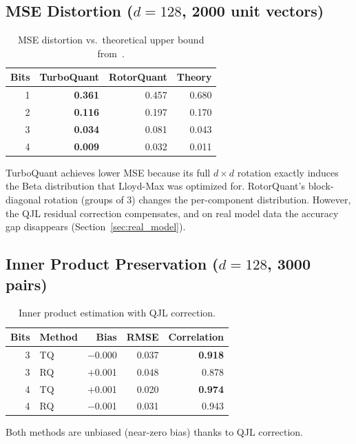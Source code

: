 \documentclass[10pt,twocolumn]{article}
\begin{document}
\subsection{MSE Distortion ($d=128$, 2000 unit vectors)}

\begin{table}[h]
\centering
\caption{MSE distortion vs.\ theoretical upper bound from~\cite{turboquant}.}
\label{tab:mse}
\begin{tabular}{@{}rrrr@{}}
\toprule
Bits & TurboQuant & RotorQuant & Theory \\
\midrule
1 & \textbf{0.361} & 0.457 & 0.680 \\
2 & \textbf{0.116} & 0.197 & 0.170 \\
3 & \textbf{0.034} & 0.081 & 0.043 \\
4 & \textbf{0.009} & 0.032 & 0.011 \\
\bottomrule
\end{tabular}
\end{table}

TurboQuant achieves lower MSE because its full $d \times d$ rotation exactly induces the Beta distribution that Lloyd-Max was optimized for.
RotorQuant's block-diagonal rotation (groups of 3) changes the per-component distribution.
However, the QJL residual correction compensates, and on real model data the accuracy gap disappears (Section~\ref{sec:real_model}).

\subsection{Inner Product Preservation ($d=128$, 3000 pairs)}

\begin{table}[h]
\centering
\caption{Inner product estimation with QJL correction.}
\label{tab:ip}
\begin{tabular}{@{}rlrrr@{}}
\toprule
Bits & Method & Bias & RMSE & Correlation \\
\midrule
3 & TQ & $-$0.000 & 0.037 & \textbf{0.918} \\
3 & RQ & $+$0.001 & 0.048 & 0.878 \\
4 & TQ & $+$0.001 & 0.020 & \textbf{0.974} \\
4 & RQ & $-$0.001 & 0.031 & 0.943 \\
\bottomrule
\end{tabular}
\end{table}

Both methods are unbiased (near-zero bias) thanks to QJL correction.
\end{document}
